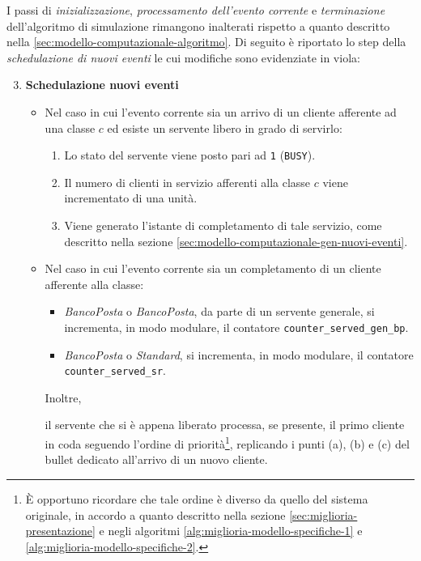 I passi di \textit{inizializzazione}, \textit{processamento dell'evento corrente} e \textit{terminazione} dell'algoritmo di simulazione rimangono inalterati rispetto a quanto descritto nella \ref{sec:modello-computazionale-algoritmo}. Di seguito è riportato lo step della \textit{schedulazione di nuovi eventi} le cui modifiche sono evidenziate in {\color{purple}viola}:
\begin{enumerate}[label=Step \arabic*), align=left, leftmargin=*]
\setcounter{enumi}{2}
\item \textbf{Schedulazione nuovi eventi}
\begin{itemize}
\item Nel caso in cui l'evento corrente sia un arrivo di un cliente afferente ad una classe $c$ ed esiste un servente libero in grado di servirlo:
\begin{enumerate}
\item Lo stato del servente viene posto pari ad \texttt{1} (\texttt{BUSY}).
\item Il numero di clienti in servizio afferenti alla classe $c$ viene incrementato di una unità.
\item Viene generato l'istante di completamento di tale servizio, come descritto nella sezione \ref{sec:modello-computazionale-gen-nuovi-eventi}.
\end{enumerate}

\item Nel caso in cui l'evento corrente sia un completamento di un cliente afferente alla classe:
{\color{purple}
\begin{itemize}
\item \uo{} \textsl{BancoPosta} o \pp{} \textsl{BancoPosta}, da parte di un servente generale, si incrementa, in modo modulare, il contatore \texttt{counter\_served\_gen\_bp}.
\item \sr{} \textsl{BancoPosta} o \sr{} \textsl{Standard}, si incrementa, in modo modulare, il contatore \texttt{counter\_served\_sr}.
\end{itemize} 
Inoltre,} il servente che si è appena liberato processa, se presente, il primo cliente in coda seguendo l'ordine di priorità\footnote{È opportuno ricordare che tale ordine è diverso da quello del sistema originale, in accordo a quanto descritto nella sezione \ref{sec:miglioria-presentazione} e negli algoritmi \ref{alg:miglioria-modello-specifiche-1} e \ref{alg:miglioria-modello-specifiche-2}.}, replicando i punti (a), (b) e (c) del bullet dedicato all'arrivo di un nuovo cliente.
\end{itemize}

\end{enumerate}

